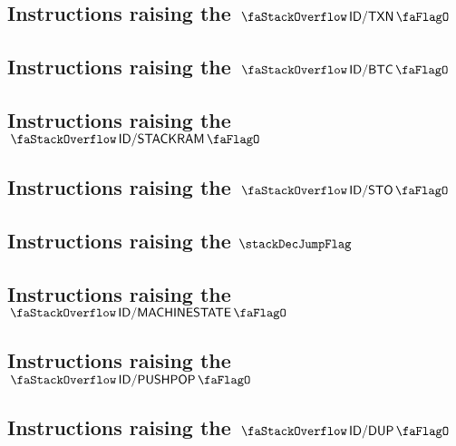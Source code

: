 \subsection{Instructions raising the $\stackDecTxnFlag$           \lispDone{}}   \label{hub: instruction handling: txn}                    
\subsection{Instructions raising the $\stackDecBtcFlag$           \lispDone{}}   \label{hub: instruction handling: btc}                    
\subsection{Instructions raising the $\stackDecStackRamFlag$      \lispDone{}}   \label{hub: instruction handling: stackRam}               
\subsection{Instructions raising the $\stackDecStoFlag$           \lispDone{}}   \label{hub: instruction handling: sto}                    
\subsection{Instructions raising the $\stackDecJumpFlag$          \lispDone{}}   \label{hub: instruction handling: jump}                   
\subsection{Instructions raising the $\stackDecMachineStateFlag$  \lispDone{}}   \label{hub: instruction handling: machineState}           
\subsection{Instructions raising the $\stackDecPushPopFlag$       \lispDone{}}   \label{hub: instruction handling: pushPop}                
\subsection{Instructions raising the $\stackDecDupFlag$           \lispDone{}}   \label{hub: instruction handling: dup}                    
